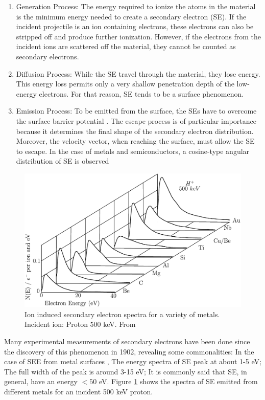 \begin{enumerate}
    \item Generation Process: The energy required to ionize the atoms in the material is the minimum energy needed to create a secondary electron (SE). If the incident projectile is an ion containing electrons, these electrons can also be stripped off and produce further ionization. However, if the electrons from the incident ions are scattered off the material, they cannot be counted as secondary electrons. 
    \item Diffusion Process: While the SE travel through the material, they lose energy. This energy loss permits only a very shallow penetration depth of the low-energy electrons. For that reason, SE tends to be a surface phenomenon. 
    \item Emission Process: To be emitted from the surface, the SEs have to overcome the surface barrier potential \parencite*[][]{ref:see2}. The escape process is of particular importance because it determines the final shape of the secondary electron distribution. Moreover, the velocity vector, when reaching the surface, must allow the SE to escape. In the case of metals and semiconductors, a cosine-type angular distribution of SE is observed \parencite[][]{ref:angleSemi}
\end{enumerate}

\begin{figure}[h]
    \centering
    \includegraphics[width=0.9\columnwidth]{SEE_Spectra/SeeSpectra.pdf}
    \caption{Ion induced secondary electron spectra for a variety of metals. Incident ion: Proton 500 \si[]{\kilo \electronvolt}. From \parencite*[][]{ref:SEEspectra} }
    \label{fig:MetalsSE}
\end{figure}

Many experimental measurements of secondary electrons have been done since the discovery of this phenomenon in 1902, revealing some commonalities: In the case of SEE from metal surfaces \parencite*[][]{ref:see3},  The energy spectra of SE peak at about 1-5 eV; The full width of the peak is around 3-15 \si[]{\electronvolt}; It is commonly said that SE, in general, have an energy $< 50$ \si[]{\electronvolt}. Figure \ref{fig:MetalsSE} shows the spectra of SE emitted from different metals for an incident 500 \si[]{\kilo\electronvolt} proton. 

